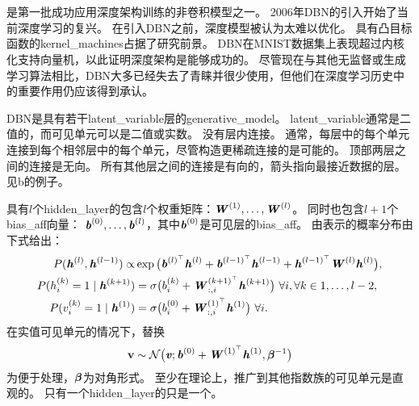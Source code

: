 
\section{}
\label{sec:deep_belief_networks}

是第一批成功应用深度架构训练的非卷积模型之一\citep{Hinton06,hinton2007learning}。
2006年\gls{DBN}的引入开始了当前深度学习的复兴。
在引入\gls{DBN}之前，深度模型被认为太难以优化。
具有凸目标函数的\gls{kernel_machines}占据了研究前景。
\gls{DBN}在MNIST数据集上表现超过内核化支持向量机，以此证明深度架构是能够成功的\citep{Hinton06}。
尽管现在与其他无监督或生成学习算法相比，\gls{DBN}大多已经失去了青睐并很少使用，但他们在深度学习历史中的重要作用仍应该得到承认。

\gls{DBN}是具有若干\gls{latent_variable}层的\gls{generative_model}。
\gls{latent_variable}通常是二值的，而可见单元可以是二值或实数。
没有层内连接。
通常，每层中的每个单元连接到每个相邻层中的每个单元，尽管构造更稀疏连接的是可能的。
顶部两层之间的连接是无向。
所有其他层之间的连接是有向的，箭头指向最接近数据的层。
见b的例子。


具有$l$个\gls{hidden_layer}的包含$l$个权重矩阵：$\boldsymbol{\mathit{W}}^{(1)},\ldots, \boldsymbol{\mathit{W}}^{(l)}$。
同时也包含$l+1$个\gls{bias_aff}向量：
$\boldsymbol{\mathit{b}}^{(0)},\ldots,\boldsymbol{\mathit{b}}^{(l)}$，其中$\boldsymbol{\mathit{b}}^{(0)}$是可见层的\gls{bias_aff}。
由表示的概率分布由下式给出：
\begin{align}
 P(\boldsymbol{\mathit{h}}^{(l)}, \boldsymbol{\mathit{h}}^{(l-1)}) \propto& \exp \big( \boldsymbol{\mathit{b}}^{(l)^\top} \boldsymbol{\mathit{h}}^{(l)} +  \boldsymbol{\mathit{b}}^{(l-1)^\top} \boldsymbol{\mathit{h}}^{(l-1)}
 + \boldsymbol{\mathit{h}}^{(l-1)^\top} \boldsymbol{\mathit{W}}^{(l)} \boldsymbol{\mathit{h}}^{(l)} \big), \\
 P(h_i^{(k)} = 1  \mid  \boldsymbol{\mathit{h}}^{(k+1)}) &= \sigma \big( b_i^{(k)} + \boldsymbol{\mathit{W}}_{:,i}^{(k+1)^\top} \boldsymbol{\mathit{h}}^{(k+1)} 
                                                          \big)~ \forall i,  \forall k \in 1, \ldots, l-2, \\
P(v_i^{(k)} = 1  \mid  \boldsymbol{\mathit{h}}^{(1)}) &=  \sigma \big( b_i^{(0)} + \boldsymbol{\mathit{W}}_{:,i}^{(1)^\top} \boldsymbol{\mathit{h}}^{(1)} 
                                                          \big)~ \forall i.
\end{align}
在实值可见单元的情况下，替换
\begin{align}
 \mathbf{v} \sim \mathcal{N} \big( \boldsymbol{\mathit{v}}; \boldsymbol{\mathit{b}}^{(0)} + \boldsymbol{\mathit{W}}^{(1)^\top} \boldsymbol{\mathit{h}}^{(1)}, \boldsymbol{\beta}^{-1} \big)
\end{align}
为便于处理，$\boldsymbol{\beta}$为对角形式。
至少在理论上，推广到其他指数族的可见单元是直观的。
只有一个\gls{hidden_layer}的只是一个。

